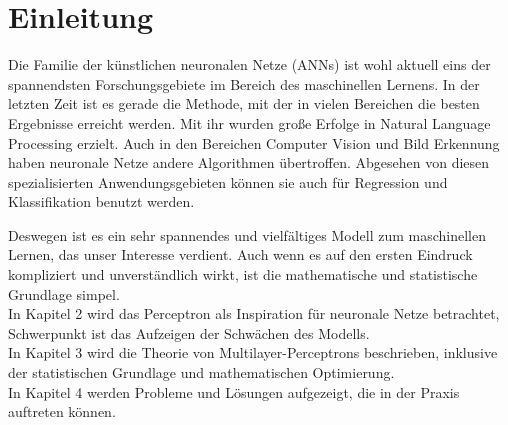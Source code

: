 \section{Einleitung}
Die Familie der künstlichen neuronalen Netze (ANNs) ist wohl aktuell eins der spannendsten Forschungsgebiete im Bereich des maschinellen Lernens. In der letzten Zeit ist es gerade die Methode, mit der in vielen Bereichen die besten Ergebnisse erreicht werden. 
Mit ihr wurden große Erfolge in Natural Language Processing erzielt. Auch in den Bereichen Computer Vision und Bild Erkennung haben neuronale Netze andere Algorithmen übertroffen\cite{LeCun2015}. Abgesehen von diesen spezialisierten Anwendungsgebieten können sie auch für Regression und Klassifikation benutzt werden.

Deswegen ist es ein sehr spannendes und vielfältiges Modell zum maschinellen Lernen, das unser Interesse verdient. Auch wenn es auf den ersten Eindruck kompliziert und unverständlich wirkt, ist die mathematische und statistische Grundlage simpel.\\
In Kapitel 2 wird das Perceptron als Inspiration für neuronale Netze betrachtet, Schwerpunkt ist das Aufzeigen der Schwächen des Modells. \\
In Kapitel 3 wird die Theorie von Multilayer-Perceptrons beschrieben, inklusive der statistischen Grundlage und mathematischen Optimierung. \\
In Kapitel 4 werden Probleme und Lösungen aufgezeigt, die in der Praxis auftreten können.
